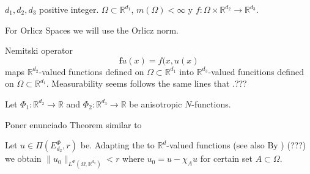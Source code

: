 \documentclass[twoside]{article}
\theoremstyle{remark}
\newcommand{\lphi}[2]{L^{\Phi}(#1,\rr^{#2})}
\newcommand{\ephi}{E^{\Phi}}
\renewcommand{\b}[1]{\boldsymbol{#1}}
\newcommand{\rr}{\mathbb{R}}
\newcommand{\franja}[2]{\Pi(\ephi_{#2},#1)}
\begin{document}
$d_1,d_2,d_3$ positive integer. 
$\Omega\subset\rr^{d_1}$, $m(\Omega)<\infty$ y $f:\Omega\times \rr^{d_2}\to\rr^{d_3}$.

For Orlicz Spaces we will use the Orlicz norm.


Nemitski operator
\[\b{f}u(x)=f(x,u(x)\]
maps  $\rr^{d_2}$-valued functions defined on $\Omega\subset\rr^{d_1}$ into   
$\rr^{d_3}$-valued funcitions defined on $\Omega\subset\rr^{d_1}$.  Measurability 
seems follows the same lines that \cite[p. 349]{krasnosel2011integral}.???

Let $\Phi_1:\rr^{d_2}\to\rr$ and $\Phi_2:\rr^{d_3}\to\rr$  be anisotropic $N$-functions. 

Poner enunciado Theorem similar to \cite[Lemma 17.1]{KR}


Let $u\in\franja{r}{d_2}$ be. Adapting  the \cite[Prop. 3, p. 92-93]{rao1991theory} 
to $\rr^d$-valued functions (see also \cite{} By \cite[Th. 5.5]{schappacher2005notion}) 
(???) we obtain $\|u_0\|_{\lphi{\Omega}{d_2}}<r$ where $u_0=u-\chi_A u$ for certain 
set $A\subset\Omega$. 



  
 
\end{document}
